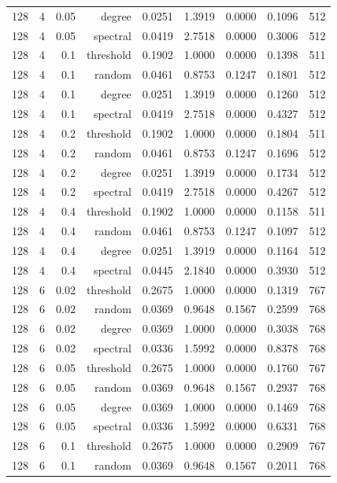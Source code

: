 \begin{table}[t]
\begin{tabular}{lrrrrrrrr}
128 & 4 & 0.05 & degree & 0.0251 & 1.3919 & 0.0000 & 0.1096 & 512 \\
128 & 4 & 0.05 & spectral & 0.0419 & 2.7518 & 0.0000 & 0.3006 & 512 \\
128 & 4 & 0.1 & threshold & 0.1902 & 1.0000 & 0.0000 & 0.1398 & 511 \\
128 & 4 & 0.1 & random & 0.0461 & 0.8753 & 0.1247 & 0.1801 & 512 \\
128 & 4 & 0.1 & degree & 0.0251 & 1.3919 & 0.0000 & 0.1260 & 512 \\
128 & 4 & 0.1 & spectral & 0.0419 & 2.7518 & 0.0000 & 0.4327 & 512 \\
128 & 4 & 0.2 & threshold & 0.1902 & 1.0000 & 0.0000 & 0.1804 & 511 \\
128 & 4 & 0.2 & random & 0.0461 & 0.8753 & 0.1247 & 0.1696 & 512 \\
128 & 4 & 0.2 & degree & 0.0251 & 1.3919 & 0.0000 & 0.1734 & 512 \\
128 & 4 & 0.2 & spectral & 0.0419 & 2.7518 & 0.0000 & 0.4267 & 512 \\
128 & 4 & 0.4 & threshold & 0.1902 & 1.0000 & 0.0000 & 0.1158 & 511 \\
128 & 4 & 0.4 & random & 0.0461 & 0.8753 & 0.1247 & 0.1097 & 512 \\
128 & 4 & 0.4 & degree & 0.0251 & 1.3919 & 0.0000 & 0.1164 & 512 \\
128 & 4 & 0.4 & spectral & 0.0445 & 2.1840 & 0.0000 & 0.3930 & 512 \\
128 & 6 & 0.02 & threshold & 0.2675 & 1.0000 & 0.0000 & 0.1319 & 767 \\
128 & 6 & 0.02 & random & 0.0369 & 0.9648 & 0.1567 & 0.2599 & 768 \\
128 & 6 & 0.02 & degree & 0.0369 & 1.0000 & 0.0000 & 0.3038 & 768 \\
128 & 6 & 0.02 & spectral & 0.0336 & 1.5992 & 0.0000 & 0.8378 & 768 \\
128 & 6 & 0.05 & threshold & 0.2675 & 1.0000 & 0.0000 & 0.1760 & 767 \\
128 & 6 & 0.05 & random & 0.0369 & 0.9648 & 0.1567 & 0.2937 & 768 \\
128 & 6 & 0.05 & degree & 0.0369 & 1.0000 & 0.0000 & 0.1469 & 768 \\
128 & 6 & 0.05 & spectral & 0.0336 & 1.5992 & 0.0000 & 0.6331 & 768 \\
128 & 6 & 0.1 & threshold & 0.2675 & 1.0000 & 0.0000 & 0.2909 & 767 \\
128 & 6 & 0.1 & random & 0.0369 & 0.9648 & 0.1567 & 0.2011 & 768 \\

\end{tabular}
\end{table}
